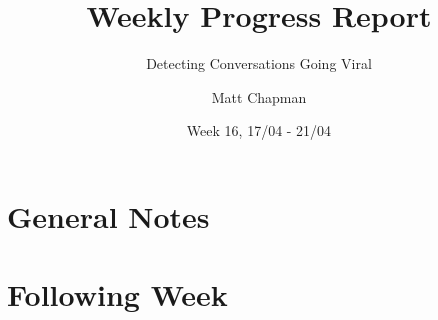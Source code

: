 \documentclass{mattreport}
\title{Weekly Progress Report}
\subtitle{Detecting Conversations Going Viral}
\date{Week 16, 17/04 - 21/04}
\author{Matt Chapman}
\begin{document}
\maketitle

\section{General Notes}

\section{Following Week}

\newpage
\printbibliography
\end{document}
